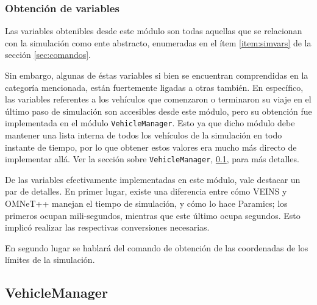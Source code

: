 \subsubsection{Obtención de variables}

Las variables obtenibles desde este módulo son todas aquellas que se relacionan con la simulación como ente abstracto, enumeradas en el ítem \ref{item:simvars} de la sección \ref{sec:comandos}.

Sin embargo, algunas de éstas variables si bien se encuentran comprendidas en la categoría mencionada, están fuertemente ligadas a otras también. En específico, las variables referentes a los vehículos que comenzaron o terminaron su viaje en el último paso de simulación son accesibles desde este módulo, pero su obtención fue implementada en el módulo \texttt{VehicleManager}. Esto ya que dicho módulo debe mantener una lista interna de todos los vehículos de la simulación en todo instante de tiempo, por lo que obtener estos valores era mucho más directo de implementar allá. Ver la sección sobre \texttt{VehicleManager}, \ref{sec:vehiclemanager}, para más detalles.

De las variables efectivamente implementadas en este módulo, vale destacar un par de detalles. En primer lugar, existe una diferencia entre cómo VEINS y OMNeT++ manejan el tiempo de simulación, y cómo lo hace Paramics; los primeros ocupan mili-segundos, mientras que este último ocupa segundos. Esto implicó realizar las respectivas conversiones necesarias.

En segundo lugar se hablará del comando de obtención de las coordenadas de los límites de la simulación.

\subsection{VehicleManager}\label{sec:vehiclemanager}